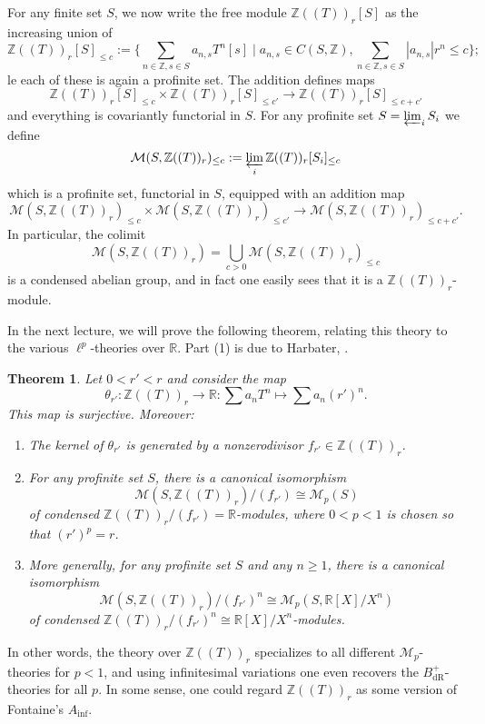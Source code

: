 \documentclass[11pt]{amsbook}
\numberwithin{equation}{section}
\newtheorem{theorem}{Theorem}
\numberwithin{theorem}{section}
\theoremstyle{definition}
\begin{document}
For any finite set $S$, we now write the free module $\mathbb Z((T))_r[S]$ as the increasing union of
\[
\mathbb Z((T))_r[S]_{\leq c} := \{\sum_{n\in \mathbb Z,s\in S} a_{n,s} T^n [s]\mid a_{n,s}\in C(S,\mathbb Z), \sum_{n\in \mathbb Z, s\in S} |a_{n,s}|r^n\leq c\};
\]le
each of these is again a profinite set. The addition defines maps
\[
\mathbb Z((T))_r[S]_{\leq c} \times \mathbb Z((T))_r[S]_{\leq c'}\to \mathbb Z((T))_r[S]_{\leq c+c'}
\]
and everything is covariantly functorial in $S$. For any profinite set $S=\varprojlim_i S_i$ we define
\[
\mathcal M(S,\mathbb Z((T))_r)_{\leq c} := \varprojlim_i \mathbb Z((T))_r[S_i]_{\leq c}
\]
which is a profinite set, functorial in $S$, equipped with an addition map
\[
\mathcal M(S,\mathbb Z((T))_r)_{\leq c} \times \mathcal M(S,\mathbb Z((T))_r)_{\leq c'}\to \mathcal M(S,\mathbb Z((T))_r)_{\leq c+c'}.
\]
In particular, the colimit
\[
\mathcal M(S,\mathbb Z((T))_r) = \bigcup_{c>0} \mathcal M(S,\mathbb Z((T))_r)_{\leq c}
\]
is a condensed abelian group, and in fact one easily sees that it is a $\mathbb Z((T))_r$-module.

In the next lecture, we will prove the following theorem, relating this theory to the various $\ell^p$-theories over $\mathbb R$. Part (1) is due to Harbater, \cite[Lemma 1.5]{HarbaterConvergentArithmetic}.

\begin{theorem}\label{thm:Ainflike} Let $0<r'<r$ and consider the map
\[
\theta_{r'}: \mathbb Z((T))_r\to \mathbb R: \sum a_n T^n\mapsto \sum a_n (r')^n.
\]
This map is surjective. Moreover:
\begin{enumerate}
\item The kernel of $\theta_{r'}$ is generated by a nonzerodivisor $f_{r'}\in \mathbb Z((T))_r$.
\item For any profinite set $S$, there is a canonical isomorphism
\[
\mathcal M(S,\mathbb Z((T))_r)/(f_{r'})\cong \mathcal M_p(S)
\]
of condensed $\mathbb Z((T))_r/(f_{r'})=\mathbb R$-modules, where $0<p<1$ is chosen so that $(r')^p=r$.
\item More generally, for any profinite set $S$ and any $n\geq 1$, there is a canonical isomorphism
\[
\mathcal M(S,\mathbb Z((T))_r)/(f_{r'})^n\cong \mathcal M_p(S,\mathbb R[X]/X^n)
\]
of condensed $\mathbb Z((T))_r/(f_{r'})^n\cong \mathbb R[X]/X^n$-modules.
\end{enumerate}
\end{theorem}

In other words, the theory over $\mathbb Z((T))_r$ specializes to all different $\mathcal M_p$-theories for $p<1$, and using infinitesimal variations one even recovers the $B_{\mathrm{dR}}^+$-theories for all $p$. In some sense, one could regard $\mathbb Z((T))_r$ as some version of Fontaine's $A_{\mathrm{inf}}$.
\end{document}
